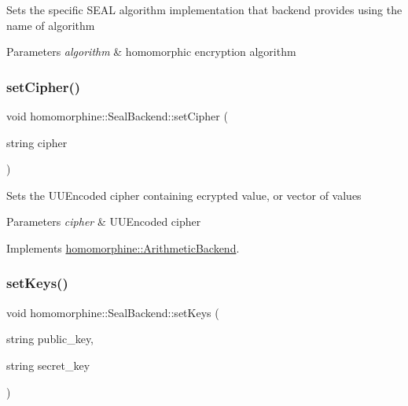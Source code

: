 Sets the specific S\+E\+AL algorithm implementation that backend provides using the name of algorithm


\begin{DoxyParams}{Parameters}
{\em algorithm} & homomorphic encryption algorithm \\
\hline
\end{DoxyParams}
\mbox{\label{classhomomorphine_1_1_seal_backend_a866b58e41809d68d4c6ed8c3afb27712}} 
\subsubsection{\texorpdfstring{setCipher()}{setCipher()}}
{\footnotesize\ttfamily void homomorphine\+::\+Seal\+Backend\+::set\+Cipher (\begin{DoxyParamCaption}\item[{string}]{cipher }\end{DoxyParamCaption})\hspace{0.3cm}{\ttfamily [virtual]}}

Sets the U\+U\+Encoded cipher containing ecrypted value, or vector of values


\begin{DoxyParams}{Parameters}
{\em cipher} & U\+U\+Encoded cipher \\
\hline
\end{DoxyParams}


Implements \mbox{\hyperlink{classhomomorphine_1_1_arithmetic_backend_af9b2d3b33a03d79facdf113c9560fc0b}{homomorphine\+::\+Arithmetic\+Backend}}.

\mbox{\label{classhomomorphine_1_1_seal_backend_a42afcc2823d616edc6be0e3950cf7196}} 
\subsubsection{\texorpdfstring{setKeys()}{setKeys()}}
{\footnotesize\ttfamily void homomorphine\+::\+Seal\+Backend\+::set\+Keys (\begin{DoxyParamCaption}\item[{string}]{public\+\_\+key,  }\item[{string}]{secret\+\_\+key }\end{DoxyParamCaption})\hspace{0.3cm}{\ttfamily [virtual]}}

